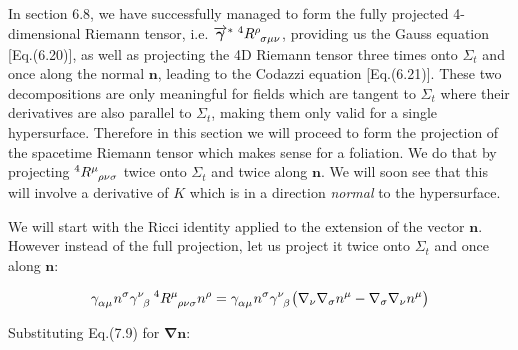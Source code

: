 \documentclass[12pt]{article}
\renewcommand{\vec}[1]{\bm{#1}}
\numberwithin{equation}{section}
\numberwithin{theorem}{subsection}
\begin{document}
In section 6.8, we have successfully managed to form the fully projected 4-dimensional Riemann tensor, i.e. $\overrightarrow{\vec{\gamma}}^{*} \; ^{4}\tensor{R}{^\rho_\sigma_\mu_\nu}$, providing us the Gauss equation [Eq.(6.20)], as well as projecting the 4D Riemann tensor three times onto $\Sigma_{t}$ and once along the normal $\vec{n}$, leading to the Codazzi equation [Eq.(6.21)]. These two decompositions are only meaningful for fields which are tangent to $\Sigma_{t}$ where their derivatives are also parallel to $\Sigma_{t}$, making them only valid for a single hypersurface. Therefore in this section we will proceed to form the projection of the spacetime Riemann tensor which makes sense for a foliation. We do that by projecting $^{4}\tensor{R}{^\mu_\rho_\nu_\sigma}$ twice onto $\Sigma_{t}$ and twice along $\vec{n}$. We will soon see that this will involve a derivative of $K$  which is in a direction \textit{normal} to the hypersurface.

\smallskip

\newline We will start with the Ricci identity applied to the extension of the vector $\vec{n}$. However instead of the full projection, let us project it twice onto $\Sigma_{t}$ and once along $\vec{n}$:

\begin{equation}

    \tensor{\gamma}{_\alpha_\mu}n^{\sigma}\tensor{\gamma}{^\nu_\beta}\, ^{4}\tensor{R}{^\mu_\rho_\nu_\sigma}n^{\rho} = \tensor{\gamma}{_\alpha_\mu}n^{\sigma}\tensor{\gamma}{^\nu_\beta}\big(\nabla_{\nu}\nabla_{\sigma}n^{\mu} - \nabla_{\sigma}\nabla_{\nu}n^{\mu} \big)

\end{equation}

Substituting Eq.(7.9) for $\vec{\nabla n}$:
\end{document}
